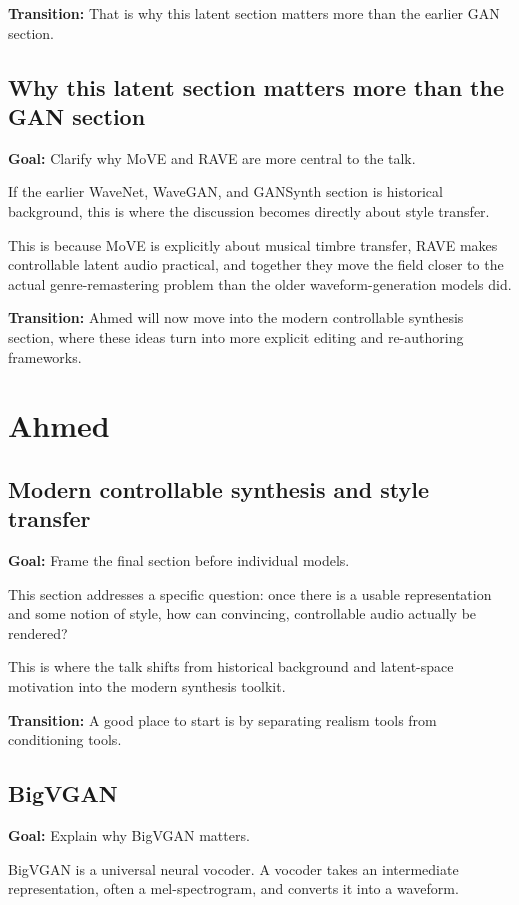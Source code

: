 \documentclass[11pt]{article}
\begin{document}
\textbf{Transition:} That is why this latent section matters more than the earlier GAN section.

\subsection*{Why this latent section matters more than the GAN section}
\textbf{Goal:} Clarify why MoVE and RAVE are more central to the talk.

If the earlier WaveNet, WaveGAN, and GANSynth section is historical background, this is where the discussion becomes directly about style transfer.

This is because MoVE is explicitly about musical timbre transfer, RAVE makes controllable latent audio practical, and together they move the field closer to the actual genre-remastering problem than the older waveform-generation models did.

\textbf{Transition:} Ahmed will now move into the modern controllable synthesis section, where these ideas turn into more explicit editing and re-authoring frameworks.

\newpage
\section{Ahmed}

\subsection*{Modern controllable synthesis and style transfer}
\textbf{Goal:} Frame the final section before individual models.

This section addresses a specific question: once there is a usable representation and some notion of style, how can convincing, controllable audio actually be rendered?

This is where the talk shifts from historical background and latent-space motivation into the modern synthesis toolkit.

\textbf{Transition:} A good place to start is by separating realism tools from conditioning tools.

\subsection*{BigVGAN}
\textbf{Goal:} Explain why BigVGAN matters.

BigVGAN is a universal neural vocoder. A vocoder takes an intermediate representation, often a mel-spectrogram, and converts it into a waveform.
\end{document}
